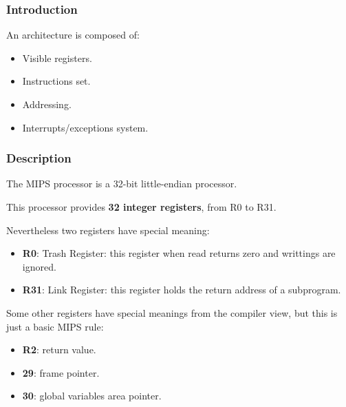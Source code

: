
\begin{frame}
  \frametitle{Introduction}

  An architecture is composed of:

  \begin{itemize}[<+->]
    \item
      Visible registers.
    \item
      Instructions set.
    \item
      Addressing.
    \item
      Interrupts/exceptions system.
  \end{itemize}
\end{frame}


\begin{frame}
  \frametitle{Description}

  The MIPS processor is a 32-bit little-endian processor.

  \nl

  This processor provides \textbf{32 integer registers}, from R0 to R31.

  \nl

  Nevertheless two registers have special meaning:

  \begin{itemize}[<+->]
    \item
      \textbf{R0}: Trash Register: this register when read returns zero and
      writtings are ignored.
    \item
      \textbf{R31}: Link Register: this register holds the return address
      of a subprogram.
  \end{itemize}

  Some other registers have special meanings from the compiler view, but
  this is just a basic MIPS rule:

  \begin{itemize}[<+->]
    \item
      \textbf{R2}: return value.
    \item
      \textbf{29}: frame pointer.
    \item
      \textbf{30}: global variables area pointer.
  \end{itemize}
\end{frame}


